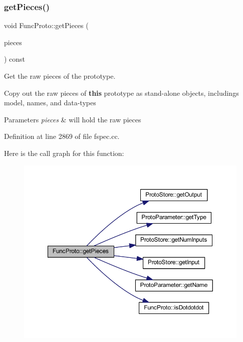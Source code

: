 \subsubsection{\texorpdfstring{getPieces()}{getPieces()}}
{\footnotesize\ttfamily void Func\+Proto\+::get\+Pieces (\begin{DoxyParamCaption}\item[{\mbox{\hyperlink{struct_prototype_pieces}{Prototype\+Pieces}} \&}]{pieces }\end{DoxyParamCaption}) const}



Get the raw pieces of the prototype. 

Copy out the raw pieces of {\bfseries{this}} prototype as stand-\/alone objects, includings model, names, and data-\/types 
\begin{DoxyParams}{Parameters}
{\em pieces} & will hold the raw pieces \\
\hline
\end{DoxyParams}


Definition at line 2869 of file fspec.\+cc.

Here is the call graph for this function\+:
\nopagebreak
\begin{figure}[H]
\begin{center}
\leavevmode
\includegraphics[width=350pt]{class_func_proto_a1b220dc769358d73110df5c60744566b_cgraph}
\end{center}
\end{figure}
\mbox{\label{class_func_proto_a41cf46f20373d37b4a7cf22201112abb}} 
